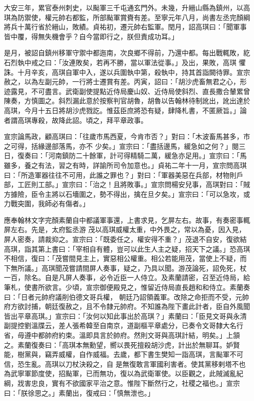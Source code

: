\begin{pinyinscope}
 大安三年，累官泰州刺史，以颭軍三千屯通玄門外。未幾，升縉山縣為鎮州，以高琪為防禦使，權元帥右都監，所部颭軍賞賚有差。至寧元年八月，尚書左丞完顏綱將兵十萬行省於縉山，敗績。貞祐初，遷元帥右監軍。閏月，詔高琪曰：「聞軍事皆中覆，得無失機會乎？自今當即行之，朕但責成功耳。」



 是月，被詔自鎮州移軍守禦中都迤南，次良鄉不得前，乃還中都。每出戰輒敗，紇石烈執中戒之曰：「汝連敗矣，若再不勝，當以軍法從事。」及出，果敗，高琪
 懼誅。十月辛亥，高琪自軍中入，遂以兵圍執中第，殺執中，持其首詣闕待罪。宣宗赦之，以為左副元帥，一行將士遷賞有差。丙寅，詔曰：「胡沙虎畜無君之心，形迹露見，不可盡言。武衛副使提點近侍局慶山奴、近侍局使斜烈、直長撒合輦累曾陳奏，方慎圖之。斜烈漏此意於按察判官胡魯，胡魯以告翰林待制訛出，訛出達於高琪，今月十五日將胡沙虎戮訖。惟茲臣庶將恐有疑，肆降札書，不匿厥旨。」論者謂高琪專殺，故降此詔。頃之，拜平章政事。



 宣宗論馬政，顧高琪曰：「往歲市馬西夏，今肯市否？」對曰：「木波畜馬甚多，市之可得，括緣邊部落馬，亦不
 少矣。」宣宗曰：「盡括邊馬，緩急如之何？」閱三日，復奏曰：「河南鎮防二十餘軍，計可得精騎二萬，緩急亦足用。」宣宗曰：「馬雖多，養之有法，習之有時，詳諭所司令加意也。」貞祐二年十一月，宣宗問高琪曰：「所造軍器往往不可用，此誰之罪也？」對曰：「軍器美惡在兵部，材物則戶部，工匠則工部。」宣宗曰：「治之！且將敗事。」宣宗問楊安兒事，高琪對曰：「賊方據險，臣令主將以石墻圍之，勢不得出，擒在旦夕矣。」宣宗曰：「可以急攻，或力戰突圍，我師必有傷者。」



 應奉翰林文字完顏素蘭自中都議軍事還，上書求見，乞屏左右。故事，有奏密事輒屏左右。先是，太府監丞游
 茂以高琪威權太重，中外畏之，常以為憂，因入見，屏人密奏，請裁抑之。宣宗曰：「既委任之，權安得不重？」茂退不自安，復欲結高琪，詣其第上書曰：「宰相自有體，豈可以此生人主之疑，招天下之議。」恐高琪不相信，復曰：「茂嘗間見主上，實惡相公權重。相公若能用茂，當使上不疑，而下無所議。」高琪聞茂嘗請間屏人奏事，疑之，乃具以聞。游茂論死，詔免死，杖一百，除名。自是凡屏人奏事，必令近臣一人侍立。及素蘭請密，召至近侍局，給筆札，使書所欲言。少頃，宣宗御便殿見之，惟留近侍局直長趙和和侍立。素蘭奏曰：「日者元帥府議削伯德文哥兵權，
 朝廷乃詔領義軍。改除之命拒而不受，元帥府方欲討捕，朝廷復赦之，且不令隸元帥府。不知誰為陛下畫此計者，臣自外風聞皆出平章高琪。」宣宗曰：「汝何以知此事出於高琪？」素蘭曰：「臣見文哥與永清副提控劉溫牒云，差人張希韓至自南京，道副樞平章處分，已奏令文哥隸大名行省，毋遵中都帥府約束。溫即具言於帥府。然則文哥與高琪計結，明矣。」上頷之。素蘭復奏曰：「高琪本無勳望，嚮以畏死擅殺胡沙虎，計出於無聊耳。妒賢能，樹黨與，竊弄威權，自作威福。去歲，都下書生樊知一詣高琪，言颭軍不可信，恐生亂。高琪以刀杖決殺之，自
 是無復敢言軍國利害者。使其黨移剌塔不也為武寧軍節度使，招颭軍，已而無功，復以為武衛軍使。以臣觀之，此賊滅亂紀綱，戕害忠良，實有不欲國家平治之意。惟陛下斷然行之，社稷之福也。」宣宗曰：「朕徐思之。」素蘭出，復戒曰：「慎無泄也。」




\end{pinyinscope}
